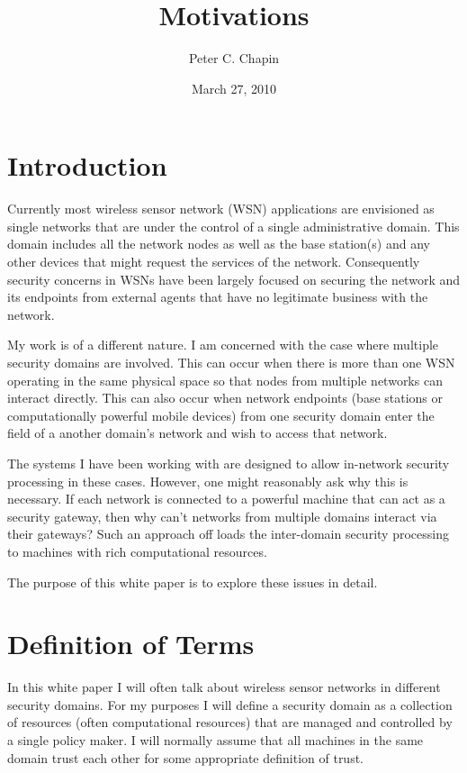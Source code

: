 \documentclass{article}
\begin{document}
\title{Motivations}
\author{Peter C. Chapin}
\date{March 27, 2010}
\maketitle

\section{Introduction}

Currently most wireless sensor network (WSN) applications are envisioned as single networks that
are under the control of a single administrative domain. This domain includes all the network
nodes as well as the base station(s) and any other devices that might request the services of
the network. Consequently security concerns in WSNs have been largely focused on securing the
network and its endpoints from external agents that have no legitimate business with the
network.

My work is of a different nature. I am concerned with the case where multiple security domains
are involved. This can occur when there is more than one WSN operating in the same physical
space so that nodes from multiple networks can interact directly. This can also occur when
network endpoints (base stations or computationally powerful mobile devices) from one security
domain enter the field of a another domain's network and wish to access that network.

The systems I have been working with are designed to allow in-network security processing in
these cases. However, one might reasonably ask why this is necessary. If each network is
connected to a powerful machine that can act as a security gateway, then why can't networks from
multiple domains interact via their gateways? Such an approach off loads the inter-domain
security processing to machines with rich computational resources.

The purpose of this white paper is to explore these issues in detail.

\section{Definition of Terms}

In this white paper I will often talk about wireless sensor networks in different security
domains. For my purposes I will define a security domain as a collection of resources (often
computational resources) that are managed and controlled by a single policy maker. I will
normally assume that all machines in the same domain trust each other for some appropriate
definition of trust.
\end{document}
